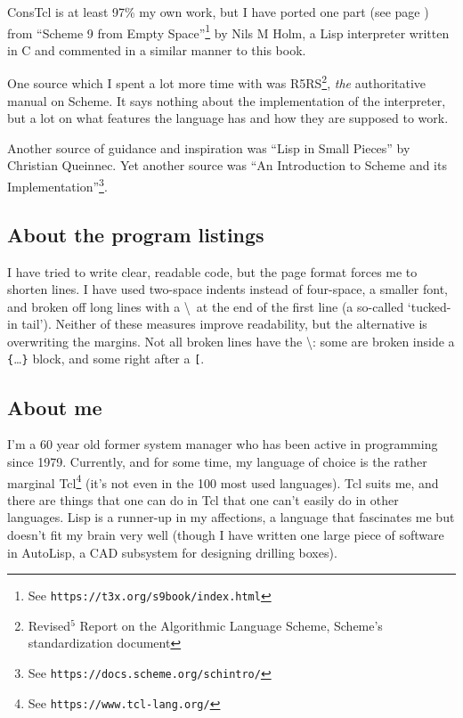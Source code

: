 \documentclass[a5paper,final]{memoir}
\begin{document}
ConsTcl is at least 97\% my own work, but I have ported one part (see page
\pageref{resolving-local-defines}) from ``Scheme 9 from Empty
Space''\footnote{See \texttt{https://t3x.org/s9book/index.html}} by Nils M Holm, a Lisp
interpreter written in C and commented in a similar manner to this book.

One source which I spent a lot more time with was R5RS\footnote{Revised${}^{5}$
Report on the Algorithmic Language Scheme, Scheme's standardization document},
\emph{the} authoritative manual on Scheme. It says nothing about the
implementation of the interpreter, but a lot on what features the language has
and how they are supposed to work.

Another source of guidance and inspiration was ``Lisp in Small Pieces'' by
Christian Queinnec. Yet another source was ``An Introduction to Scheme and its
Implementation''\footnote{See \texttt{https://docs.scheme.org/schintro/}}.

\subsection{About the program listings}
\label{about-the-program-listings}

I have tried to write clear, readable code, but the page format forces me to
shorten lines. I have used two-space indents instead of four-space, a smaller
font, and broken off long lines with a \textbackslash\  at the end of the first
line (a so-called `tucked-in tail'). Neither of these measures improve
readability, but the alternative is overwriting the margins. Not all broken
lines have the \textbackslash: some are broken inside a
\texttt{\{}\ldots\texttt{\}} block, and some right after a \texttt{^^5b}.

\subsection{About me}
\label{about-me}

I'm a 60 year old former system manager who has been active in programming
since 1979. Currently, and for some time, my language of choice is the
rather marginal Tcl\footnote{See \texttt{https://www.tcl-lang.org/}} (it's not
even in the 100 most used languages). Tcl suits me, and there are things that
one can do in Tcl that one can't easily do in other languages. Lisp is a
runner-up in my affections, a language that fascinates me but doesn't fit my
brain very well (though I have written one large piece of software in AutoLisp,
a CAD subsystem for designing drilling boxes).
\end{document}
